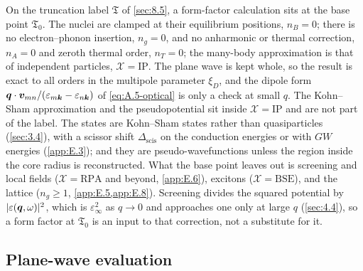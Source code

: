 On the truncation label $\mathfrak{T}$ of \cref{sec:8.5}, a form-factor calculation sits at the base point $\mathfrak{T}_0$. The nuclei are clamped at their equilibrium positions, $n_B = 0$; there is no electron--phonon insertion, $n_g = 0$, and no anharmonic or thermal correction, $n_A = 0$ and zeroth thermal order, $n_T = 0$; the many-body approximation is that of independent particles, $\mathcal{X} = \mathrm{IP}$. The plane wave is kept whole, so the result is exact to all orders in the multipole parameter $\xi_D$, and the dipole form $\bm{q}\cdot\bm{v}_{mn}/(\varepsilon_{m\bm{k}} - \varepsilon_{n\bm{k}})$ of \cref{eq:A.5-optical} is only a check at small $q$. The Kohn--Sham approximation and the pseudopotential sit inside $\mathcal{X} = \mathrm{IP}$ and are not part of the label. The states are Kohn--Sham states rather than quasiparticles (\cref{sec:3.4}), with a scissor shift $\Delta_{\mathrm{scis}}$ on the conduction energies or with $GW$ energies (\cref{app:E.3}); and they are pseudo-wavefunctions unless the region inside the core radius is reconstructed. What the base point leaves out is screening and local fields ($\mathcal{X} = \mathrm{RPA}$ and beyond, \cref{app:E.6}), excitons ($\mathcal{X} = \mathrm{BSE}$), and the lattice ($n_g \ge 1$, \cref{app:E.5,app:E.8}). Screening divides the squared potential by $|\varepsilon(\bm{q},\omega)|^2$, which is $\varepsilon_\infty^2$ as $q \to 0$ and approaches one only at large $q$ (\cref{sec:4.4}), so a form factor at $\mathfrak{T}_0$ is an input to that correction, not a substitute for it.

\subsection{Plane-wave evaluation}

